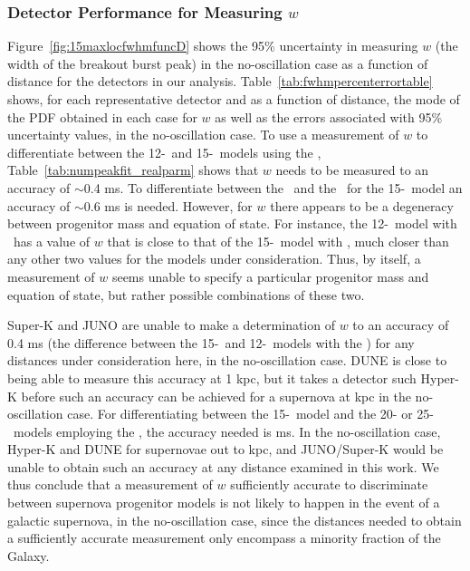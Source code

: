 \subsubsection{Detector Performance for Measuring $w$}
Figure~\ref{fig:15maxlocfwhmfuncD} shows the 95\% uncertainty in
measuring $w$ (the width of the breakout burst peak) in the
no-oscillation case as a function of distance for the detectors in our
analysis. 
Table~\ref{tab:fwhmpercenterrortable} shows, for each representative
detector and as a function of distance, the mode of the PDF obtained
in each case for $w$ as well as the 
errors associated with 95\% uncertainty values, in the no-oscillation case.
To use a measurement of $w$ to differentiate between the 12-\Msol\ and
15-\Msol\ models using the \ls,
Table~\ref{tab:numpeakfit_realparm}
 shows that $w$ needs to be measured to an accuracy  of $\sim$0.4 ms.
To differentiate between the \ls\ and the \shen\ for the
15-\Msol\ model an accuracy of $\sim$0.6 ms is needed.  However, for
$w$ there appears to be a degeneracy between progenitor mass and
equation of state.  For instance, the 12-\Msol\ model with \ls\ has a
value of $w$ that is close to that of the 15-\Msol\ model with \shen,
much closer than any other two values for the models under
consideration.  Thus, by itself, 
a measurement of $w$ seems unable to
specify a particular progenitor mass and equation of state, but rather
possible combinations of these two.

Super-K and JUNO are unable to make a determination of $w$ to an accuracy of
0.4 ms (the difference between the 15-\Msol\ and 12-\Msol\ models with
the \ls) for any distances under consideration here, 
in the no-oscillation case.  DUNE is close to
being able to measure this accuracy at 1 kpc, but it takes a
detector such Hyper-K before such an accuracy can be achieved for a
supernova at  kpc in the no-oscillation case.
For differentiating
between the 15-\Msol\ model and the 20- or 25-\Msol\ models employing
the \ls, the accuracy needed is  ms.  In the no-oscillation
case, Hyper-K and
 DUNE for supernovae out to  kpc, and JUNO/Super-K would be
unable to obtain such an accuracy at any distance examined in this
work.  We thus conclude that a measurement of
$w$ sufficiently accurate to discriminate between supernova progenitor
models is not likely to happen in the event of a galactic supernova,
in the no-oscillation case, 
since the distances needed to obtain a sufficiently accurate
measurement only encompass a minority fraction of the Galaxy.


